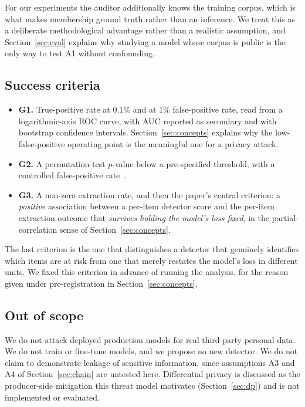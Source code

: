 For our experiments the auditor additionally knows the training corpus, which is what
makes membership ground truth rather than an inference. We treat this as a deliberate
methodological advantage rather than a realistic assumption, and Section~\ref{sec:eval}
explains why studying a model whose corpus is public is the only way to test A1 without
confounding.

\subsection{Success criteria}
\begin{itemize}
 \item \textbf{G1.} True-positive rate at $0.1\%$ and at $1\%$ false-positive rate, read
 from a logarithmic-axis ROC curve, with AUC reported as secondary and with bootstrap
 confidence intervals. Section~\ref{sec:concepts} explains why the low-false-positive
 operating point is the meaningful one for a privacy attack.
 \item \textbf{G2.} A permutation-test $p$-value below a pre-specified threshold, with a
 controlled false-positive rate~\citep{oren2024proving}.
 \item \textbf{G3.} A non-zero extraction rate, and then the paper's central criterion: a
 \emph{positive} association between a per-item detector score and the per-item extraction
 outcome that \emph{survives holding the model's loss fixed}, in the partial-correlation
 sense of Section~\ref{sec:concepts}.
\end{itemize}

The last criterion is the one that distinguishes a detector that genuinely identifies
which items are at risk from one that merely restates the model's loss in different
units. We fixed this criterion in advance of running the analysis, for the reason given
under pre-registration in Section~\ref{sec:concepts}.

\subsection{Out of scope}
We do not attack deployed production models for real third-party personal data. We do not
train or fine-tune models, and we propose no new detector. We do not claim to demonstrate
leakage of sensitive information, since assumptions A3 and A4 of
Section~\ref{sec:chain} are untested here. Differential privacy is discussed as the
producer-side mitigation this threat model motivates (Section~\ref{sec:dp}) and is not
implemented or evaluated.
